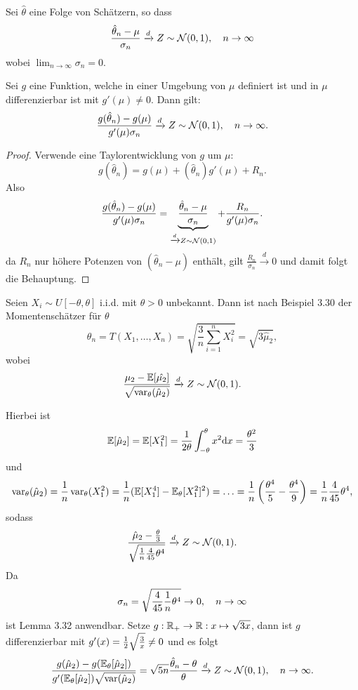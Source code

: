 \begin{lem}
  Sei $\hat{\theta}$ eine Folge von Schätzern, so dass
  \[ \frac{\hat{\theta}_n - \mu}{\sigma_n} \xrightarrow{d}
    Z \sim \mathcal{N}(0,1), \quad n \to \infty \]
  wobei $\lim_{n \to \infty} \sigma_n = 0$.

  Sei $g$ eine Funktion, welche in einer Umgebung von $\mu$ definiert ist und in
  $\mu$ differenzierbar ist mit $g'(\mu) \ne 0$. Dann gilt:
  \[ \frac{g(\hat{\theta}_n) - g(\mu)}{g'(\mu) \sigma_n}
    \xrightarrow{d} Z \sim \mathcal{N}(0,1), \quad n \to \infty. \]
\end{lem}

\begin{proof}
  Verwende eine Taylorentwicklung von $g$ um $\mu$:
  \[ g(\hat{\theta}_n) = g(\mu) + (\hat{\theta}_n) g'(\mu) + R_n. \]
  Also
  \[ \frac{g(\hat{\theta}_n) - g(\mu)}{g'(\mu) \sigma_n} =
    \underbrace{\frac{\hat{\theta}_n - \mu}{\sigma_n}}_{
      \xrightarrow{d} Z \sim \mathcal{N}(0,1)}
    + \frac{R_n}{g'(\mu) \sigma_n}. \]
  da $R_n$ nur höhere Potenzen von $(\hat{\theta}_n - \mu)$ enthält, gilt
  $\frac{R_n}{\sigma_n} \xrightarrow{d} 0$ und damit folgt die Behauptung.
\end{proof}

\begin{exmp}
  Seien $X_i \sim U[-\theta, \theta]$ i.i.d. mit $\theta > 0$ unbekannt. Dann
  ist nach Beispiel 3.30 der Momentenschätzer für $\theta$
  \[ \theta_n = T(X_1, \ldots, X_n) = \sqrt{\frac{3}{n} \sum_{i=1}^n X_i^2}
    = \sqrt{3 \hat{\mu}_2}, \]
  wobei
  \[ \frac{\mu_2 - \mathbb{E}[\hat{\mu_2}]}{\sqrt{\operatorname{var}_\theta(\hat{\mu}_2)}}
    \xrightarrow{d} Z \sim \mathcal{N}(0,1). \]

  Hierbei ist
  \[ \mathbb{E}[\hat{\mu}_2] = \mathbb{E}[X_1^2] = \frac{1}{2\theta} \int_{-\theta}^\theta x^2
    \mathrm{d} x = \frac{\theta^2}{3} \]
  und
  \[ \operatorname{var}_\theta(\hat{\mu}_2) = \frac{1}{n} \operatorname{var}_\theta (X_1^2) =
    \frac{1}{n} (\mathbb{E}[X_1^4] - \mathbb{E}_\theta[X_1^2]^2) = \ldots =
    \frac{1}{n} \left( \frac{\theta^4}{5}-\frac{\theta^4}{9} \right)
    = \frac{1}{n} \frac{4}{45} \theta^4, \]
  sodass
  \[ \frac{\hat{\mu}_2
      - \frac{\theta}{3}}{\sqrt{\frac{1}{n} \frac{4}{45} \theta^4}}
    \xrightarrow{d} Z \sim \mathcal{N}(0,1). \]
  Da
  \[ \sigma_n = \sqrt{\frac{4}{45} \frac{1}{n} \theta^4} \to 0, \quad n \to
    \infty \]
  ist Lemma 3.32 anwendbar. Setze $g: \mathbb{R}_+ \to \mathbb{R} : x \mapsto \sqrt{3x}$,
  dann ist $g$ differenzierbar mit $g'(x) = \frac{1}{2} \sqrt{\frac{3}{x}} \ne 0$
  und es folgt
  \[ \frac{g(\hat{\mu}_2) -
      g(\mathbb{E}_\theta[\hat{\mu}_2])}
    {g'(\mathbb{E}_\theta[\hat{\mu}_2]) \sqrt{\operatorname{var}(\hat{\mu}_2)}}
    = \sqrt{5n} \frac{\hat{\theta}_n-\theta}{\theta}
    \xrightarrow{d} Z \sim \mathcal{N}(0,1), \quad n \to \infty. \]
\end{exmp}

